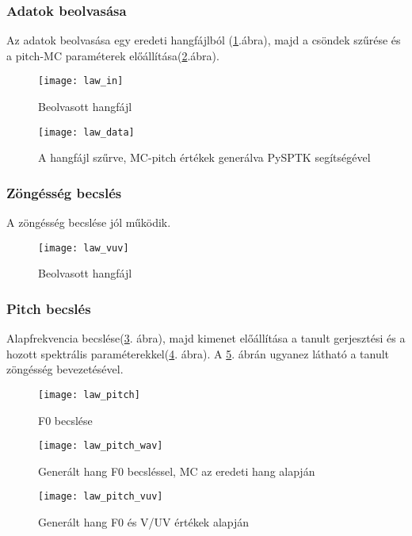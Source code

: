 \subsubsection{Adatok beolvasása}
Az adatok beolvasása egy eredeti hangfájlból (\ref{law-1}.ábra), majd a csöndek szűrése és a pitch-MC paraméterek előállítása(\ref{law-2}.ábra).
\begin{figure}[h]
	
	\par\centering	
	\texttt{[image: law\_in]}
	\caption{Beolvasott hangfájl}
	\label{law-1}
\end{figure}
\begin{figure}[h]
	\par\centering	
	\texttt{[image: law\_data]}
	\caption{A hangfájl szűrve, MC-pitch értékek generálva PySPTK segítségével}
	\label{law-2}
\end{figure}
\subsubsection{Zöngésség becslés}
A zöngésség becslése jól működik.
\begin{figure}[h]
	
	\par\centering	
	\texttt{[image: law\_vuv]}
	\caption{Beolvasott hangfájl}
\end{figure}
\subsubsection{Pitch becslés}
Alapfrekvencia becslése(\ref{law-3}. ábra), majd kimenet előállítása a tanult gerjesztési és a hozott spektrális paraméterekkel(\ref{law-4}. ábra). A \ref{law-5}. ábrán ugyanez látható a tanult zöngésség bevezetésével.
\begin{figure}[h]
	\par\centering	
	\texttt{[image: law\_pitch]}
	\caption{F0 becslése}
		\label{law-3}
\end{figure}
\begin{figure}[h]
	\par\centering	
	\texttt{[image: law\_pitch\_wav]}
	\caption{Generált hang F0 becsléssel, MC az eredeti hang alapján}
		\label{law-4}
\end{figure}
\begin{figure}[h]
	\par\centering	
	\texttt{[image: law\_pitch\_vuv]}
	\caption{Generált hang F0 és V/UV értékek alapján}
		\label{law-5}
\end{figure}

